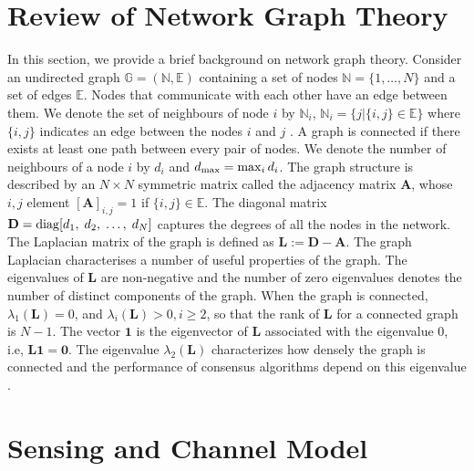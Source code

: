 \documentclass[onecolumn, draft, 12pt]{IEEEtran}
\newcommand{\onevect}{\mathbf{1}}
\newcommand{\La}{\mathbf{L}}
\newcommand{\D}{\mathbf{D}}
\newcommand{\A}{\mathbf{A}}
\begin{document}
\section{Review of Network Graph Theory} \label{sec:review_spectral_robust}
In this section, we provide a brief background on network graph theory. Consider an undirected graph $\mathbb{G}=(\mathbb{N}, \mathbb{E})$ containing a set of nodes $\mathbb{N}=\{1, \ldots, N\}$ and a set of edges $\mathbb{E}$. Nodes that communicate with each other have an edge between them. We denote the set of neighbours of node $i$ by $\mathbb{N}_{i}$, $\mathbb{N}_{i}=\{j|\{i,j\} \in \mathbb{E}\}$ where $\{i,j\}$ indicates an edge between the nodes $i$ and $j$ \cite{chung}. A graph is connected if there exists at least one path between every pair of nodes. We denote the number of neighbours of a node $i$ by $d_i$ and $d_{\rm max}=\max_{i} d_i$. The graph structure is described by an $N \times N$ symmetric matrix called the adjacency matrix $\A$, whose $i,j$ element $[\A]_{i,j}=1$ if $\{i,j\} \in \mathbb{E}$. The diagonal matrix $\D ={\rm diag} [d_{1},\;  d_{2}, \; \ldots, \; d_{N}]$ captures the degrees of all the nodes in the network. The Laplacian matrix of the graph is defined as $\La:=\D - \A$. The graph Laplacian characterises a number of useful properties of the graph. The eigenvalues of $\La$ are non-negative and the number of zero eigenvalues denotes the number of distinct components of the graph. When the graph is connected, $\lambda_1 (\La) =0$, and $\lambda_i (\La) > 0 , i \geq 2$,  so that the rank of $\La$ for a connected graph is $N-1$. The vector $\onevect$ is the eigenvector of $\La$ associated with the eigenvalue $0$, i.e, $\La \onevect =\mathbf{0}$. The eigenvalue $\lambda_2 (\La)$ characterizes how densely the graph is connected and the performance of consensus algorithms depend on this eigenvalue \cite{OlfatiSaber2004}.

\section{Sensing and Channel Model} \label{sec:consensus_no_noise_robust}
\end{document}
